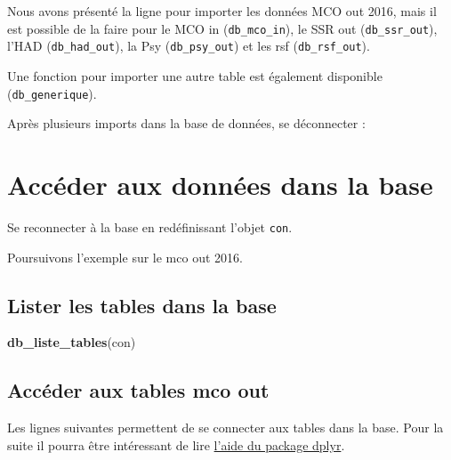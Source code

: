 \documentclass[]{book}
\newenvironment{Shaded}{\begin{snugshade}}{\end{snugshade}}
\newcommand{\KeywordTok}[1]{\textcolor[rgb]{0.13,0.29,0.53}{\textbf{#1}}}
\newcommand{\NormalTok}[1]{#1}
\newcommand{\OperatorTok}[1]{\textcolor[rgb]{0.81,0.36,0.00}{\textbf{#1}}}
\begin{document}
Nous avons présenté la ligne pour importer les données MCO out 2016, mais il est possible de la faire pour le MCO in (\texttt{db\_mco\_in}), le SSR out (\texttt{db\_ssr\_out}), l'HAD (\texttt{db\_had\_out}), la Psy (\texttt{db\_psy\_out}) et les rsf (\texttt{db\_rsf\_out}).

Une fonction pour importer une autre table est également disponible (\texttt{db\_generique}).

Après plusieurs imports dans la base de données, se déconnecter :

\begin{Shaded}
\end{Shaded}

\hypertarget{acceder-aux-donnees-dans-la-base}{%
\section{Accéder aux données dans la base}\label{acceder-aux-donnees-dans-la-base}}

Se reconnecter à la base en redéfinissant l'objet \texttt{con}.

Poursuivons l'exemple sur le mco out 2016.

\hypertarget{lister-les-tables-dans-la-base}{%
\subsection{Lister les tables dans la base}\label{lister-les-tables-dans-la-base}}

\begin{Shaded}
\begin{Highlighting}[]
\KeywordTok{db_liste_tables}\NormalTok{(con)}
\end{Highlighting}
\end{Shaded}

\hypertarget{acceder-aux-tables-mco-out}{%
\subsection{Accéder aux tables mco out}\label{acceder-aux-tables-mco-out}}

Les lignes suivantes permettent de se connecter aux tables dans la base. Pour la suite il pourra être intéressant de lire \href{http://db.rstudio.com/dplyr/}{l'aide du package dplyr}.
\end{document}
